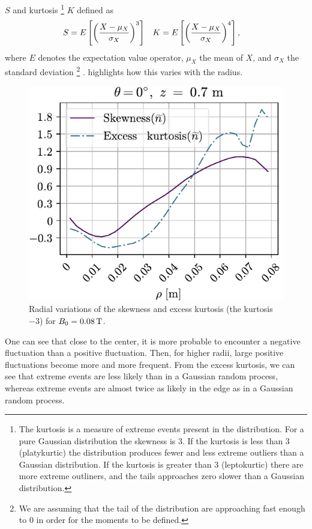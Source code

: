 %
$S$ and kurtosis%
%
\footnote{
    The kurtosis is a measure of extreme events present in the distribution.
    For a pure Gaussian distribution the skewness is 3.
    If the kurtosis is less than 3 (platykurtic) the distribution produces fewer and less extreme outliers than a Gaussian distribution.
    If the kurtosis is greater than 3 (leptokurtic) there are more extreme outliners, and the tails approaches zero slower than a Gaussian distribution.
}
%
$K$ defined as
%
\begin{align*}
    &S=E\left[\left(\frac{X - \mu_X}{\sigma_X}\right)^3\right]&
    &K=E\left[\left(\frac{X - \mu_X}{\sigma_X}\right)^4\right],
\end{align*}
%
where $E$ denotes the expectation value operator, $\mu_X$ the mean of $X$, and $\sigma_X$ the standard deviation%
\footnote{We are assuming that the tail of the distribution are approaching fast enough to $0$ in order for the moments to be defined.}%
.
 highlights how this varies with the radius.
%
\begin{figure}[htb]
    \centering
    \includegraphics{fig/results/skewKurt/008T}
    \caption{Radial variations of the skewness and excess kurtosis (the kurtosis $-3$) for $B_0 = 0.08\, \text{T}$.}
    \label{fig:skewKurt008}
\end{figure}
%

One can see that close to the center, it is more probable to encounter a negative fluctuation than a positive fluctuation.
Then, for higher radii, large positive fluctuations become more and more frequent.
From the excess kurtosis, we can see that extreme events are less likely than in a Gaussian random process, whereas extreme events are almost twice as likely in the edge as in a Gaussian random process.

